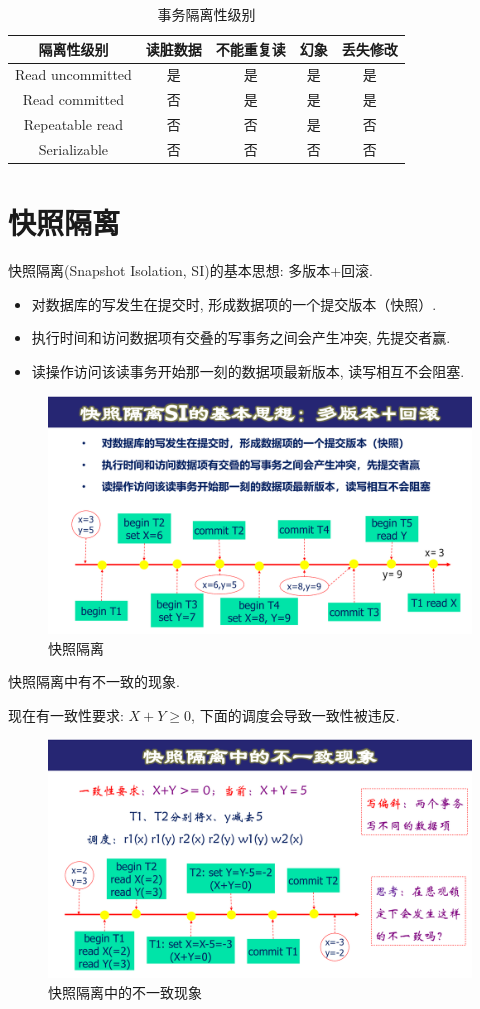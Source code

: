 \begin{table}[H]
  \centering
  \begin{tabular}{|c|c|c|c|c|}
    \hline
    \textbf{隔离性级别} & \textbf{读脏数据} & \textbf{不能重复读} & \textbf{幻象} & \textbf{丢失修改} \\ \hline
    Read uncommitted & 是 & 是 & 是 & 是 \\ \hline
    Read committed & 否 & 是 & 是 & 是 \\ \hline
    Repeatable read & 否 & 否 & 是 & 否 \\ \hline
    Serializable & 否 & 否 & 否 & 否 \\ \hline
  \end{tabular}
  \caption{事务隔离性级别}
\end{table}

\section{快照隔离}

快照隔离(Snapshot Isolation, SI)的基本思想: 多版本+回滚.
\begin{itemize}
  \item 对数据库的写发生在提交时, 形成数据项的一个提交版本（快照）.
  \item 执行时间和访问数据项有交叠的写事务之间会产生冲突, 先提交者赢.
  \item 读操作访问该读事务开始那一刻的数据项最新版本, 读写相互不会阻塞.
\end{itemize}

\begin{figure}[H]
    \centering
    \includegraphics[width=.6\textwidth]{./figure/快照隔离.pdf}
    \caption{快照隔离}
\end{figure}

快照隔离中有不一致的现象.
\begin{example}
  现在有一致性要求: $X+Y\ge 0$, 下面的调度会导致一致性被违反.
  \begin{figure}[H]
      \centering
      \includegraphics[width=.5\textwidth]{./figure/快照隔离不一致.pdf}
      \caption{快照隔离中的不一致现象}
  \end{figure}
\end{example}

